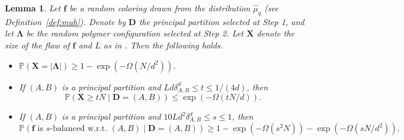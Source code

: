 \documentclass{amsart}
\newtheorem{lem}[thm]{Lemma}
\theoremstyle{definition}
\newcommand{\0}[0]{\emptyset}
\newcommand{\pr}[0]{\mathbb{P}}
\begin{document}
\begin{lem}\label{lem:defect}
Let $\mathbf f$ be a random coloring drawn from the distribution $\hat{\mu}_q$ (see Definition~\ref{def:muh}). Denote by $\mathbf D$ the principal partition selected at Step 1, and let $\mathbf \Lambda$ be the random polymer configuration selected at Step 2. Let $\mathbf X$ denote the size of the flaw of $\mathbf f$ and $L$ as in .
Then the following holds.
\begin{itemize}
\item[(i)] $\pr(\mathbf X = |\mathbf\Lambda|) \geq 1 - \exp\left(-\Omega\left(N/d^2\right)\right)$.

\item[(ii)] If $(A, B)$ is a principal partition and $Ld\delta^d_{A, B} \leq t \leq 1/(4d)$, then
\[
\pr(\mathbf X \geq tN \mid \mathbf D=(A, B)) \leq \exp\left(-\Omega\left(tN/d\right)\right).
\]

\item[(iii)] If $(A, B)$ is a principal partition and $10Ld^2\delta_{A, B}^d \leq s\leq 1$, then
\[
\pr\left(\text{$\mathbf f$ is $s$-balanced w.r.t. $(A, B)$} \mid \mathbf D=(A, B) \right) \geq 1 - \exp\left(-\Omega\left(s^2N\right)\right) - \exp\left(-\Omega\left(sN/d^2\right)\right).
\]

\end{itemize}
\end{lem}
\end{document}
